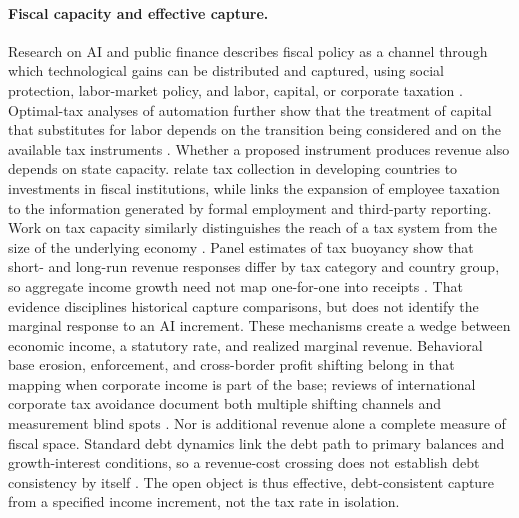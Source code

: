 \paragraph{Fiscal capacity and effective capture.}
Research on AI and public finance describes fiscal policy as a channel through which technological gains can be distributed and captured, using social protection, labor-market policy, and labor, capital, or corporate taxation \citep{brollo2024fiscal,korinek2026public}. Optimal-tax analyses of automation further show that the treatment of capital that substitutes for labor depends on the transition being considered and on the available tax instruments \citep{guerreiro2022robots}. Whether a proposed instrument produces revenue also depends on state capacity. \citet{besley2014taxation} relate tax collection in developing countries to investments in fiscal institutions, while \citet{jensen2022employment} links the expansion of employee taxation to the information generated by formal employment and third-party reporting. Work on tax capacity similarly distinguishes the reach of a tax system from the size of the underlying economy \citep{gaspar2016tax}. Panel estimates of tax buoyancy show that short- and long-run revenue responses differ by tax category and country group, so aggregate income growth need not map one-for-one into receipts \citep{dudine2018buoyancy}. That evidence disciplines historical capture comparisons, but does not identify the marginal response to an AI increment. These mechanisms create a wedge between economic income, a statutory rate, and realized marginal revenue. Behavioral base erosion, enforcement, and cross-border profit shifting belong in that mapping when corporate income is part of the base; reviews of international corporate tax avoidance document both multiple shifting channels and measurement blind spots \citep{beer2020international,brollo2024fiscal}. Nor is additional revenue alone a complete measure of fiscal space. Standard debt dynamics link the debt path to primary balances and growth-interest conditions, so a revenue-cost crossing does not establish debt consistency by itself \citep{escolano2010debt,imf2016fiscalspace}. The open object is thus effective, debt-consistent capture from a specified income increment, not the tax rate in isolation.

